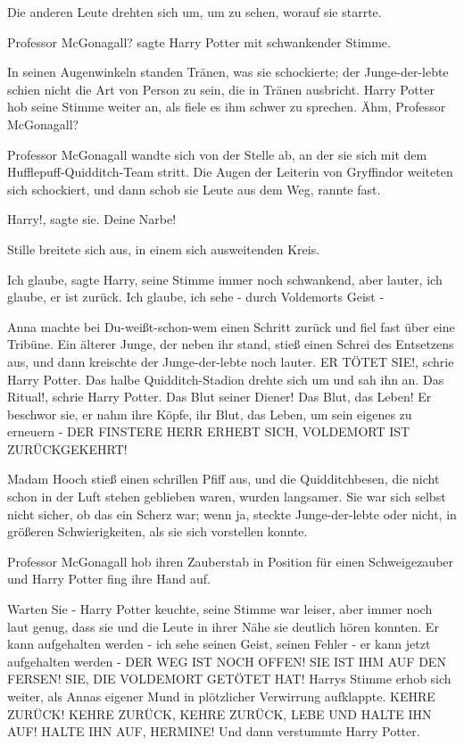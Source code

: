 Die anderen Leute drehten sich um, um zu sehen, worauf sie starrte.

\glqq{}Professor McGonagall?\grqq{} sagte Harry Potter mit schwankender Stimme.

In seinen Augenwinkeln standen Tränen, was sie schockierte; der Junge-der-lebte
schien nicht die Art von Person zu sein, die in Tränen ausbricht. Harry Potter
hob seine Stimme weiter an, als fiele es ihm schwer zu sprechen. \glqq{}Ähm,
Professor McGonagall?\grqq{}

Professor McGonagall wandte sich von der Stelle ab, an der sie sich mit dem
Hufflepuff-Quidditch-Team stritt. Die Augen der Leiterin von Gryffindor weiteten
sich schockiert, und dann schob sie Leute aus dem Weg, rannte fast.

\glqq{}Harry!\grqq{}, sagte sie. \glqq{}Deine Narbe!\grqq{}

Stille breitete sich aus, in einem sich ausweitenden Kreis.

\glqq{}Ich glaube\grqq{}, sagte Harry, seine Stimme immer noch schwankend, aber
lauter, \glqq{}ich glaube, er ist zurück. Ich glaube, ich sehe - durch Voldemorts
Geist -\grqq{}

Anna machte bei Du-weißt-schon-wem einen Schritt zurück und fiel fast über eine
Tribüne. Ein älterer Junge, der neben ihr stand, stieß einen Schrei des
Entsetzens aus, und dann kreischte der Junge-der-lebte noch lauter. \glqq{}ER
TÖTET SIE!\grqq{}, schrie Harry Potter. Das halbe Quidditch-Stadion drehte sich
um und sah ihn an. \glqq{}Das Ritual!\grqq{}, schrie Harry Potter. \glqq{}Das Blut
seiner Diener! Das Blut, das Leben! Er beschwor sie, er nahm ihre Köpfe, ihr
Blut, das Leben, um sein eigenes zu erneuern - DER FINSTERE HERR ERHEBT SICH,
VOLDEMORT IST ZURÜCKGEKEHRT!\grqq{}

Madam Hooch stieß einen schrillen Pfiff aus, und die Quidditchbesen, die nicht
schon in der Luft stehen geblieben waren, wurden langsamer. Sie war sich selbst
nicht sicher, ob das ein Scherz war; wenn ja, steckte Junge-der-lebte oder
nicht, in größeren Schwierigkeiten, als sie sich vorstellen konnte.

Professor McGonagall hob ihren Zauberstab in Position für einen Schweigezauber
und Harry Potter fing ihre Hand auf.

\glqq{}Warten Sie -\grqq{} Harry Potter keuchte, seine Stimme war leiser, aber immer
noch laut genug, dass sie und die Leute in ihrer Nähe sie deutlich hören
konnten. \glqq{}Er kann aufgehalten werden - ich sehe seinen Geist, seinen Fehler
- er kann jetzt aufgehalten werden - DER WEG IST NOCH OFFEN! SIE IST IHM AUF DEN
FERSEN! SIE, DIE VOLDEMORT GETÖTET HAT!\grqq{} Harrys Stimme erhob sich weiter, als
Annas eigener Mund in plötzlicher Verwirrung aufklappte. \glqq{}KEHRE ZURÜCK!
KEHRE ZURÜCK, KEHRE ZURÜCK, LEBE UND HALTE IHN AUF! HALTE IHN AUF, HERMINE!\grqq{} Und
dann verstummte Harry Potter.

